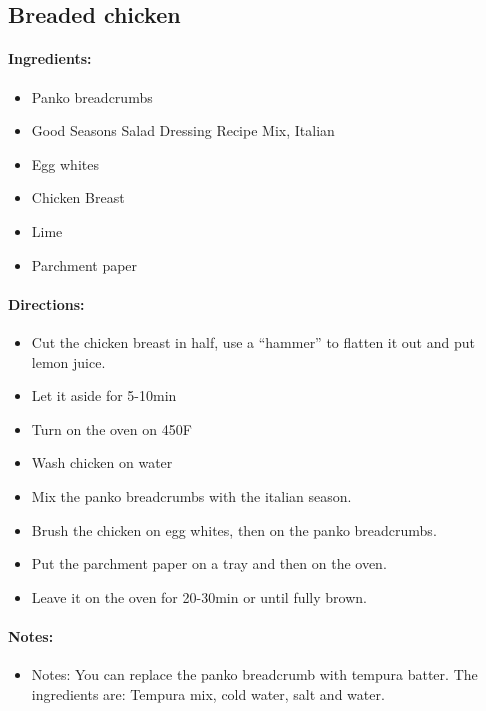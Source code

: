 \documentclass{article}
\begin{document}
\subsection{Breaded chicken}

\paragraph{Ingredients:}
\begin{itemize}
    \item Panko breadcrumbs
    \item Good Seasons Salad Dressing Recipe Mix, Italian
    \item Egg whites
    \item Chicken Breast
    \item Lime
    \item Parchment paper
\end{itemize}

\paragraph{Directions:}
\begin{itemize}
    \item Cut the chicken breast in half, use a “hammer” to flatten it out and put lemon juice.
    \item Let it aside for 5-10min
    \item Turn on the oven on 450F
    \item Wash chicken on water
    \item Mix the panko breadcrumbs with the italian season.
    \item Brush the chicken on egg whites, then on the panko breadcrumbs.
    \item Put the parchment paper on a tray and then on the oven.
    \item Leave it on the oven for 20-30min or until fully brown.
\end{itemize}

\paragraph{Notes:}
\begin{itemize}
    \item Notes: You can replace the panko breadcrumb with tempura batter. The ingredients are: Tempura mix, cold water, salt and water.
\end{itemize}
\end{document}
